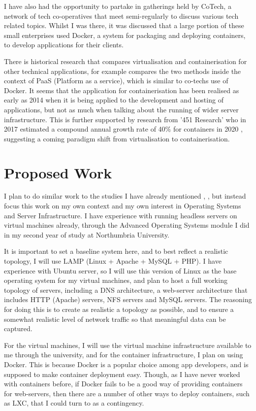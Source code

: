 I have also had the opportunity to partake in gatherings held by CoTech, a network of tech co-operatives that meet semi-regularly to discuss various tech related topics. Whilst I was there, it was discussed that a large portion of these small enterprises used Docker, a system for packaging and deploying containers, to develop applications for their clients.

There is historical research that compares virtualisation and containerisation for other technical applications, for example \citep{dua14} compares the two methods inside the context of PaaS (Platform as a service), which is similar to co-techs use of Docker. It seems that the application for containerisation has been realised as early as 2014 when it is being applied to the development and hosting of applications, but not as much when talking about the running of wider server infrastructure. This is further supported by research from '451 Research' who in 2017 estimated a compound annual growth rate of 40\% for containers in 2020 \citep{451}, suggesting a coming paradigm shift from virtualisation to containerisation.

\section{Proposed Work}
\label{proposed}
I plan to do similar work to the studies I have already mentioned \citep{joy15}, \citep{dua14}, but instead focus this work on my own context and my own interest in Operating Systems and Server Infrastructure. I have experience with running headless servers on virtual machines already, through the Advanced Operating Systems module I did in my second year of study at Northumbria University. 

It is important to set a baseline system here, and to best reflect a realistic topology, I will use LAMP (Linux + Apache + MySQL + PHP). I have experience with Ubuntu server, so I will use this version of Linux as the base operating system for my virtual machines, and plan to host a full working topology of servers, including a DNS architecture, a web-server architecture that includes HTTP (Apache) servers, NFS servers and MySQL servers. The reasoning for doing this is to create as realistic a topology as possible, and to ensure a somewhat realistic level of network traffic so that meaningful data can be captured.

For the virtual machines, I will use the virtual machine infrastructure available to me through the university, and for the container infrastructure, I plan on using Docker. This is because Docker is a popular choice among app developers, and is supposed to make container deployment easy. Though, as I have never worked with containers before, if Docker fails to be a good way of providing containers for web-servers, then there are a number of other ways to deploy containers, such as LXC, that I could turn to as a contingency.

